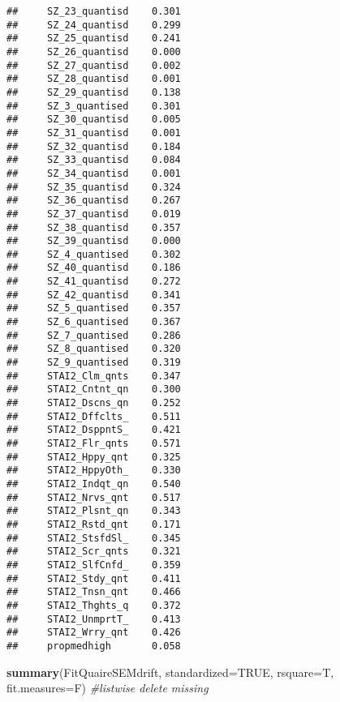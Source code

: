 \documentclass[]{article}
\newenvironment{Shaded}{\begin{snugshade}}{\end{snugshade}}
\newcommand{\KeywordTok}[1]{\textcolor[rgb]{0.13,0.29,0.53}{\textbf{#1}}}
\newcommand{\DataTypeTok}[1]{\textcolor[rgb]{0.13,0.29,0.53}{#1}}
\newcommand{\CommentTok}[1]{\textcolor[rgb]{0.56,0.35,0.01}{\textit{#1}}}
\newcommand{\OtherTok}[1]{\textcolor[rgb]{0.56,0.35,0.01}{#1}}
\newcommand{\NormalTok}[1]{#1}
\begin{document}
\begin{verbatim}
##     SZ_23_quantisd    0.301
##     SZ_24_quantisd    0.299
##     SZ_25_quantisd    0.241
##     SZ_26_quantisd    0.000
##     SZ_27_quantisd    0.002
##     SZ_28_quantisd    0.001
##     SZ_29_quantisd    0.138
##     SZ_3_quantised    0.301
##     SZ_30_quantisd    0.005
##     SZ_31_quantisd    0.001
##     SZ_32_quantisd    0.184
##     SZ_33_quantisd    0.084
##     SZ_34_quantisd    0.001
##     SZ_35_quantisd    0.324
##     SZ_36_quantisd    0.267
##     SZ_37_quantisd    0.019
##     SZ_38_quantisd    0.357
##     SZ_39_quantisd    0.000
##     SZ_4_quantised    0.302
##     SZ_40_quantisd    0.186
##     SZ_41_quantisd    0.272
##     SZ_42_quantisd    0.341
##     SZ_5_quantised    0.357
##     SZ_6_quantised    0.367
##     SZ_7_quantised    0.286
##     SZ_8_quantised    0.320
##     SZ_9_quantised    0.319
##     STAI2_Clm_qnts    0.347
##     STAI2_Cntnt_qn    0.300
##     STAI2_Dscns_qn    0.252
##     STAI2_Dffclts_    0.511
##     STAI2_DsppntS_    0.421
##     STAI2_Flr_qnts    0.571
##     STAI2_Hppy_qnt    0.325
##     STAI2_HppyOth_    0.330
##     STAI2_Indqt_qn    0.540
##     STAI2_Nrvs_qnt    0.517
##     STAI2_Plsnt_qn    0.343
##     STAI2_Rstd_qnt    0.171
##     STAI2_StsfdSl_    0.345
##     STAI2_Scr_qnts    0.321
##     STAI2_SlfCnfd_    0.359
##     STAI2_Stdy_qnt    0.411
##     STAI2_Tnsn_qnt    0.466
##     STAI2_Thghts_q    0.372
##     STAI2_UnmprtT_    0.413
##     STAI2_Wrry_qnt    0.426
##     propmedhigh       0.058
\end{verbatim}

\begin{Shaded}
\begin{Highlighting}[]
\KeywordTok{summary}\NormalTok{(FitQuaireSEMdrift, }\DataTypeTok{standardized=}\OtherTok{TRUE}\NormalTok{, }\DataTypeTok{rsquare=}\NormalTok{T, }\DataTypeTok{fit.measures=}\NormalTok{F) }\CommentTok{#listwise delete missing}
\end{Highlighting}
\end{Shaded}
\end{document}
